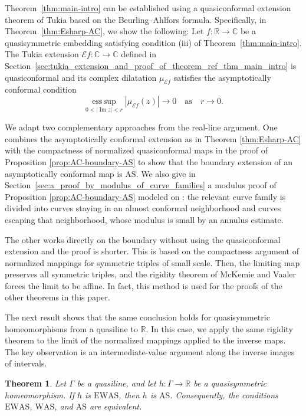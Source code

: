 \documentclass[10pt,a4paper]{amsart}
\numberwithin{equation}{section}
\newtheorem{theorem}{Theorem}[section]
\newcommand{\R}{\mathbb{R}}
\newcommand{\C}{\mathbb{C}}
\newcommand{\esssup}{\operatorname*{ess\,sup}}
\begin{document}
Theorem~\ref{thm:main-intro} can be established using a quasiconformal extension theorem of Tukia \cite{TukiaExtension} based on the Beurling--Ahlfors formula.
Specifically, in Theorem~\ref{thm:Esharp-AC}, we show the following:
Let $f\colon\R\to\C$ be a quasisymmetric embedding satisfying condition \textup{(iii)} of Theorem~\ref{thm:main-intro}.  
The Tukia extension $\mathcal Ef\colon\C\to\C$ defined in Section~\ref{sec:tukia_extension_and_proof_of_theorem_ref_thm_main_intro} is quasiconformal and its complex dilatation $\mu_{\mathcal Ef}$ satisfies the asymptotically conformal condition
\[
 \esssup_{0<|\operatorname{Im}z|<r}
 |\mu_{\mathcal Ef}(z)| \to 0 \quad \text{as}\quad r \to 0.
\]

We adapt two complementary approaches from the real-line argument.  
One combines the asymptotically conformal extension as in Theorem \ref{thm:Esharp-AC} with the compactness of normalized quasiconformal maps in the proof of Proposition \ref{prop:AC-boundary-AS} to show that the boundary extension of an asymptotically conformal map is $\mathrm{AS}$.  
We also give in Section~\ref{sec:a_proof_by_modulus_of_curve_families} a modulus proof of Proposition \ref{prop:AC-boundary-AS} modeled on \cite[Theorem~3.1]{BraniaYang}: the relevant curve family is divided into curves staying in an almost conformal neighborhood and curves escaping that neighborhood, whose modulus is small by an annulus estimate.

The other works directly on the boundary without using the quasiconformal extension and the proof is shorter. 
This is based on the compactness argument of normalized mappings for symmetric triples of small scale. 
Then, the limiting map preserves all symmetric triples, and the rigidity theorem of McKemie and Vaaler \cite{McKemieVaaler} forces the limit to be affine. 
In fact, this method is used for the proofs of the other theorems in this paper.

The next result shows that the same conclusion holds for quasisymmetric homeomorphisms from a quasiline to $\mathbb R$.
In this case, we apply the same rigidity theorem to the limit of the normalized mappings applied to the inverse maps. The key observation is an intermediate-value argument along the inverse images of intervals.

\begin{theorem}\label{thm:onto-line-intro}
Let $\Gamma$ be a quasiline, and let $h\colon\Gamma\to\R$ be a quasisymmetric homeomorphism.  
If $h$ is $\mathrm{EWAS}$, then $h$ is $\mathrm{AS}$. Consequently, the conditions $\mathrm{EWAS}$, $\mathrm{WAS}$, and $\mathrm{AS}$ are equivalent.
\end{theorem}
\end{document}
